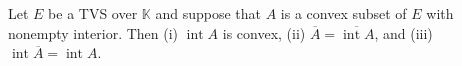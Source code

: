 Let $E$ be a TVS over $\mathbb{K}$ and suppose that $A$ is a convex subset of $E$ with nonempty interior. Then (i) $\operatorname{int} A$ is convex, (ii) $\overline{A} = \overline{\operatorname{int} A}$, and (iii) $\operatorname{int} \overline{A} = \operatorname{int} A$.